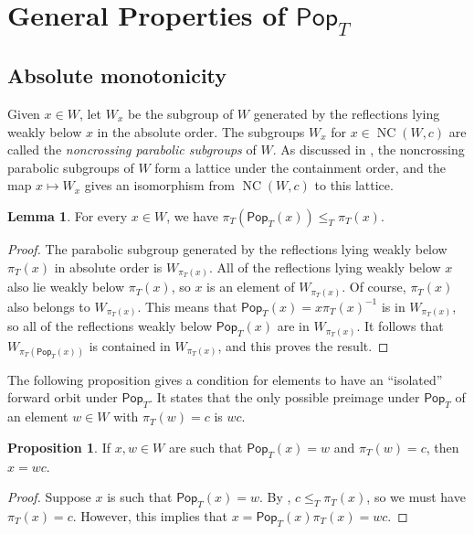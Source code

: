 \documentclass[10pt,a4paper]{amsart}
\theoremstyle{definition}
\newtheorem{lemma}[lemma]{Lemma}
\newtheorem{prop}[prop]{Proposition}
\newcommand{\darkblue}{\color{darkblue}}
\newcommand{\defn}[1]{\emph{\darkblue #1}}
\newcommand{\pop}{\mathsf{Pop}}
\DeclareMathOperator{\NC}{NC}
\begin{document}
\section{General Properties of \texorpdfstring{$\pop_T$}{Pop}}
\label{sec:general_properties}

\subsection{Absolute monotonicity}

Given $x\in W$, let $W_x$ be the subgroup of $W$ generated by the reflections lying weakly below $x$ in the absolute order. The subgroups $W_x$ for $x\in \NC(W,c)$ are called the \defn{noncrossing parabolic subgroups} of $W$. As discussed in \cite{ReadingNoncrossing}, the noncrossing parabolic subgroups of $W$ form a lattice under the containment order, and the map $x\mapsto W_x$ gives an isomorphism from $\NC(W,c)$ to this lattice. 

\begin{lemma}
\label{lem:monotone}
For every $x \in W$, we have $\pi_T(\pop_T(x))\leq_T \pi_T(x)$.
\end{lemma}
\begin{proof}
The parabolic subgroup generated by the reflections lying weakly below $\pi_T(x)$ in absolute order is $W_{\pi_T(x)}$. All of the reflections lying weakly below $x$ also lie weakly below $\pi_T(x)$, so $x$ is an element of $W_{\pi_T(x)}$. Of course, $\pi_T(x)$ also belongs to $W_{\pi_T(x)}$. This means that $\pop_T(x)=x\pi_T(x)^{-1}$ is in $W_{\pi_T(x)}$, so all of the reflections weakly below $\pop_T(x)$ are in $W_{\pi_T(x)}$. It follows that 
$W_{\pi_T(\pop_T(x))}$ is contained in $W_{\pi_T(x)}$, and this proves the result. 
\end{proof}

The following proposition gives a condition for elements to have an ``isolated'' forward orbit under $\pop_T$. It states that the only possible preimage under $\pop_T$ of an element $w \in W$ with $\pi_T(w)=c$ is $wc$.

\begin{prop}
\label{prop:preimages}
If $x,w\in W$ are such that $\pop_T(x)=w$ and $\pi_T(w)=c$, then $x=wc$.
\end{prop}

\begin{proof}
Suppose $x$ is such that $\pop_T(x)=w$.  By , $c\leq_T\pi_T(x)$, so we must have $\pi_T(x)=c$. However, this implies that $x=\pop_T(x)\pi_T(x)=wc$.  
\end{proof}
\end{document}
